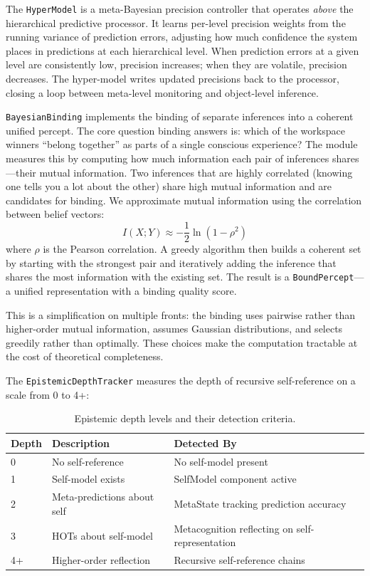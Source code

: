 The \texttt{HyperModel} is a meta-Bayesian precision controller that operates \textit{above} the hierarchical predictive processor. It learns per-level precision weights from the running variance of prediction errors, adjusting how much confidence the system places in predictions at each hierarchical level. When prediction errors at a given level are consistently low, precision increases; when they are volatile, precision decreases. The hyper-model writes updated precisions back to the processor, closing a loop between meta-level monitoring and object-level inference.

\texttt{BayesianBinding} implements the binding of separate inferences into a coherent unified percept. The core question binding answers is: which of the workspace winners ``belong together'' as parts of a single conscious experience? The module measures this by computing how much information each pair of inferences shares---their mutual information. Two inferences that are highly correlated (knowing one tells you a lot about the other) share high mutual information and are candidates for binding. We approximate mutual information using the correlation between belief vectors:
\begin{equation}
I(X;Y) \approx -\frac{1}{2}\ln(1 - \rho^2)
\label{eq:mutual-info}
\end{equation}
where $\rho$ is the Pearson correlation. A greedy algorithm then builds a coherent set by starting with the strongest pair and iteratively adding the inference that shares the most information with the existing set. The result is a \texttt{BoundPercept}---a unified representation with a binding quality score.

This is a simplification on multiple fronts: the binding uses pairwise rather than higher-order mutual information, assumes Gaussian distributions, and selects greedily rather than optimally. These choices make the computation tractable at the cost of theoretical completeness.

The \texttt{EpistemicDepthTracker} measures the depth of recursive self-reference on a scale from 0 to 4+:

\begin{table}[t]
\centering
\begin{tabular}{lll}
\toprule
\textbf{Depth} & \textbf{Description} & \textbf{Detected By} \\
\midrule
0 & No self-reference & No self-model present \\
1 & Self-model exists & SelfModel component active \\
2 & Meta-predictions about self & MetaState tracking prediction accuracy \\
3 & HOTs about self-model & Metacognition reflecting on self-representation \\
4+ & Higher-order reflection & Recursive self-reference chains \\
\bottomrule
\end{tabular}
\caption{Epistemic depth levels and their detection criteria.}
\label{tab:epistemic-depth}
\end{table}

